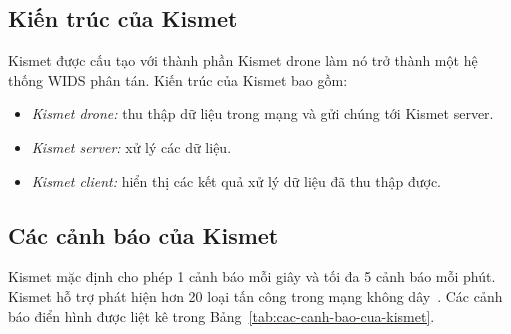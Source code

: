 \subsection{Kiến trúc của Kismet}
Kismet được cấu tạo với thành phần Kismet drone làm nó trở thành một hệ thống WIDS phân tán. Kiến trúc của Kismet bao gồm:

\begin{itemize}
\item \emph{Kismet drone:} thu thập dữ liệu trong mạng và gửi chúng tới Kismet server.
\item \emph{Kismet server:} xử lý các dữ liệu.
\item \emph{Kismet client:} hiển thị các kết quả xử lý dữ liệu đã thu thập được.
\end{itemize}

\subsection{Các cảnh báo của Kismet}
Kismet mặc định cho phép 1 cảnh báo mỗi giây và tối đa 5 cảnh báo mỗi phút. Kismet hỗ trợ phát hiện hơn 20 loại tấn công trong mạng không dây~\cite{mike2016kismet}. Các cảnh báo điển hình được liệt kê trong Bảng~\ref{tab:cac-canh-bao-cua-kismet}.

\headsep=0pt

